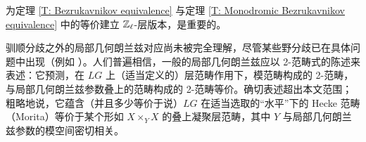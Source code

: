 \begin{rmk}\label{R: int Bez}
为定理 \ref{T: Bezrukavnikov equivalence} 与定理 \ref{T: Monodromic Bezrukavnikov equivalence} 中的等价建立 ${\mathbb Z}_\ell$-层版本，是重要的。
\end{rmk}

\begin{rmk}\label{2-categorical LGL}
驯顺分歧之外的局部几何朗兰兹对应尚未被完全理解，尽管某些野分歧已在具体问题中出现（例如 \cite{HNY-Kloosterman, Zhu-FG-vs-HNY}）。人们普遍相信，一般的局部几何朗兰兹应以 2-范畴式的陈述来表述：它预测，在 $LG$ 上（适当定义的）层范畴作用下，模范畴构成的 2-范畴，与局部几何朗兰兹参数叠上的范畴构成的 2-范畴等价。确切表述超出本文范围；粗略地说，它蕴含（并且多少等价于说）$LG$ 在适当选取的“水平”下的 Hecke 范畴（Morita）等价于某个形如 $X\times_{Y}X$ 的叠上凝聚层范畴，其中 $Y$ 与局部几何朗兰兹参数的模空间密切相关。
\end{rmk}
